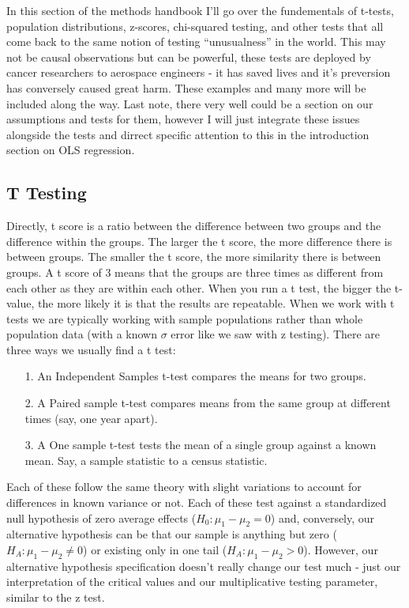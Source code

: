 \documentclass[12pt]{article}\usepackage[]{graphicx}\usepackage[]{color}
\begin{document}
\begin{flushleft}
In this section of the methods handbook I'll go over the fundementals of t-tests, population distributions, z-scores, chi-squared testing, and other tests that all come back to the same notion of testing ``unusualness'' in the world. This may not be causal observations but can be powerful, these tests are deployed by cancer researchers to aerospace engineers - it has saved lives and it's preversion has conversely caused great harm. These examples and many more will be included along the way. Last note, there very well could be a section on our assumptions and tests for them, however I will just integrate these issues alongside the tests and dirrect specific attention to this in the introduction section on OLS regression.

\subsection{T Testing}

Directly, t score is a ratio between the difference between two groups and the difference within the groups. The larger the t score, the more difference there is between groups. The smaller the t score, the more similarity there is between groups. A t score of 3 means that the groups are three times as different from each other as they are within each other. When you run a t test, the bigger the t-value, the more likely it is that the results are repeatable. When we work with t tests we are typically working with sample populations rather than whole population data (with a known $\sigma$ error like we saw with z testing). There are three ways we usually find a t test:

\begin{itemize}
\item[1.] An Independent Samples t-test compares the means for two groups.
\item[2.] A Paired sample t-test compares means from the same group at different times (say, one year apart).
\item[3.] A One sample t-test tests the mean of a single group against a known mean. Say, a sample statistic to a census statistic.
\end{itemize}

Each of these follow the same theory with slight variations to account for differences in known variance or not. Each of these test against a standardized null hypothesis of zero average effects ($ H_0 : \mu_1 - \mu_2 = 0$) and, conversely, our alternative hypothesis can be that our sample is anything but zero ($H_A : \mu_1 - \mu_2 \neq 0$) or existing only in one tail ($H_A : \mu_1 - \mu_2 > 0$). However, our alternative hypothesis specification doesn't really change our test much - just our interpretation of the critical values and our multiplicative testing parameter, similar to the z test.


\end{flushleft}
\end{document}
